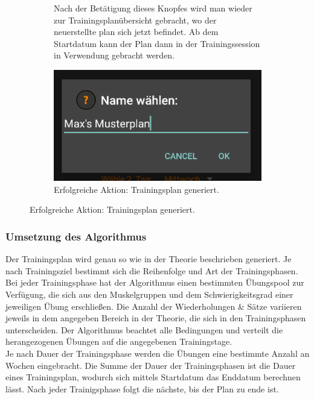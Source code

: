 \documentclass[FIPLY_base.tex]{subfiles}
\begin{document}
	\begin{figure}[H]
		\begin{subfigure}[b]{0.4\textwidth}
			Nach der Betätigung dieses Knopfes wird man wieder zur Trainingsplanübersicht gebracht, wo der neuerstellte plan sich jetzt befindet. Ab dem Startdatum kann der Plan dann in der Trainingssession in Verwendung gebracht werden.
			\newline
		\end{subfigure}
		\hfil
		\begin{subfigure}[b]{0.5\textwidth}
			\includegraphics[scale=0.5]{img/plannameinput}
			\caption{Erfolgreiche Aktion: Trainingsplan generiert.}
		\end{subfigure}
	\end{figure}
	\subsubsection{Umsetzung des Algorithmus}
	Der Trainingsplan wird genau so wie in der Theorie beschrieben generiert. Je nach Trainingsziel bestimmt sich die Reihenfolge und Art der Trainingsphasen. Bei jeder Trainingsphase hat der Algorithmus einen bestimmten Übungspool zur Verfügung, die sich aus den Muskelgruppen und dem Schwierigkeitsgrad einer jeweiligen Übung erschließen. Die Anzahl der Wiederholungen \& Sätze variieren jeweils in dem angegeben Bereich in der Theorie, die sich in den Trainingsphasen unterscheiden. Der Algorithmus beachtet alle Bedingungen und verteilt die herangezogenen Übungen auf die angegebenen Trainingstage. 
	\ \\
	Je nach Dauer der Trainingsphase werden die Übungen eine bestimmte Anzahl an Wochen eingebracht. Die Summe der Dauer der Trainingsphasen ist die Dauer eines Trainingsplan, wodurch sich mittels Startdatum das Enddatum berechnen lässt. Nach jeder Trainigsphase folgt die nächste, bis der Plan zu ende ist. 
\end{document}
